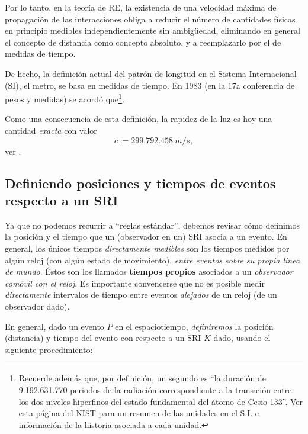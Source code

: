 Por lo tanto, en la teoría de RE, la existencia de una velocidad máxima de propagación de las interacciones obliga a reducir el número de cantidades físicas en principio medibles independientemente sin ambig\"uedad, eliminando en general el concepto de distancia como concepto absoluto, y a reemplazarlo por el de medidas de tiempo.

De hecho, la definición actual del patrón de longitud en el Sistema
Internacional (SI), el metro, se basa en medidas de tiempo. En 1983 (en la 17a
conferencia de pesos y medidas) se acordó que\footnote{Recuerde además que, por definición, un segundo es ``la duración de 9.192.631.770 periodos de la radiación correspondiente a la transición entre los dos niveles hiperfinos del estado fundamental del átomo de Cesio 133''. Ver \href{http://physics.nist.gov/cuu/Units/current.html}{esta} página del NIST para un resumen de las unidades en el S.I. e información de la historia asociada a cada unidad.}.
\begin{quotation}
\end{quotation}
Como una consecuencia de esta definición, la rapidez de la luz es hoy una
cantidad \textit{exacta} con valor
\begin{equation}
\boxed{c:=299.792.458\ m/s,}
\end{equation}
ver \cite{CODATA00}.

\subsection{Definiendo posiciones y tiempos de eventos respecto a un SRI}

Ya que no podemos recurrir a ``reglas estándar'', debemos revisar cómo definimos la posición y el tiempo que un (observador en un) SRI asocia a un evento. En general, los únicos tiempos \textit{directamente medibles} son los tiempos medidos por algún reloj (con algún estado de movimiento), \textit{entre eventos sobre su propia línea de mundo}. Éstos son los llamados \textbf{tiempos propios} asociados a un \textit{observador comóvil con el reloj}. Es importante convencerse que no es posible medir \textit{directamente} intervalos de tiempo entre eventos \textit{alejados} de un reloj (de un observador dado).

En general, dado un evento $P$ en el espaciotiempo, \textit{definiremos} la posición (distancia) y tiempo del evento con respecto a un SRI $K$ dado, usando el siguiente procedimiento:

